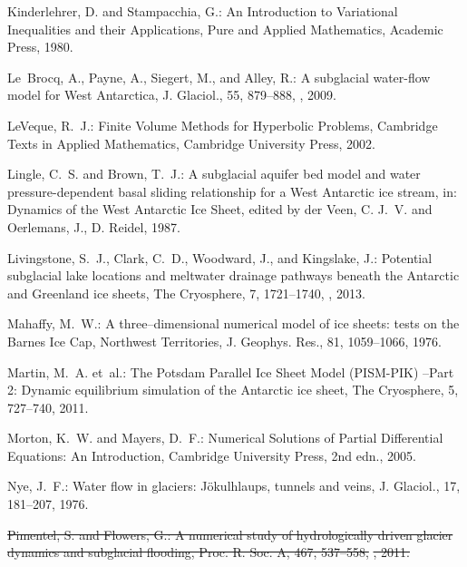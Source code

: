 \documentclass[gmd]{copernicus}   %
\providecommand{\DIFdel}[1]{{\protect\color{red}\sout{#1}}}                      %
\providecommand{\DIFdelbegin}{} %
\begin{document}
\begin{thebibliography}{}
Kinderlehrer, D. and Stampacchia, G.: An {I}ntroduction to {V}ariational
  {I}nequalities and their {A}pplications, Pure and Applied Mathematics,
  Academic Press, 1980.

Le~Brocq, A., Payne, A., Siegert, M., and Alley, R.: A subglacial water-flow
  model for {W}est {A}ntarctica, J. Glaciol., 55, 879--888,
  , 2009.

LeVeque, R.~J.: Finite Volume Methods for Hyperbolic Problems, Cambridge Texts
  in Applied Mathematics, Cambridge University Press, 2002.

Lingle, C.~S. and Brown, T.~J.: A subglacial aquifer bed model and water
  pressure-dependent basal sliding relationship for a {W}est {A}ntarctic ice
  stream, in: Dynamics of the {W}est {A}ntarctic {I}ce {S}heet, edited by der
  Veen, C. J.~V. and Oerlemans, J., D. Reidel, 1987.

Livingstone, S.~J., Clark, C.~D., Woodward, J., and Kingslake, J.: Potential
  subglacial lake locations and meltwater drainage pathways beneath the
  {A}ntarctic and {G}reenland ice sheets, The Cryosphere, 7, 1721--1740,
  , 2013.

Mahaffy, M.~W.: A three--dimensional numerical model of ice sheets: tests on
  the {B}arnes {I}ce {C}ap, {N}orthwest {T}erritories, J. Geophys. Res., 81,
  1059--1066, 1976.

Martin, M.~A. et~al.: The {P}otsdam {P}arallel {I}ce {S}heet
  {M}odel ({PISM-PIK}) --{P}art 2: {D}ynamic equilibrium simulation of the
  {A}ntarctic ice sheet, The Cryosphere, 5, 727--740, 2011.

Morton, K.~W. and Mayers, D.~F.: Numerical {S}olutions of {P}artial
  {D}ifferential {E}quations: {A}n {I}ntroduction, Cambridge University Press,
  2nd edn., 2005.

Nye, J.~F.: Water flow in glaciers: {J}\"okulhlaups, tunnels and veins, J.
  Glaciol., 17, 181--207, 1976.

\DIFdelbegin %
\DIFdel{Pimentel, S. and Flowers, G.: A numerical study of hydrologically driven
  glacier dynamics and subglacial flooding, Proc. R. Soc. A, 467, 537--558,
  }%
\DIFdel{, 2011.
}%


\end{thebibliography}
\end{document}
